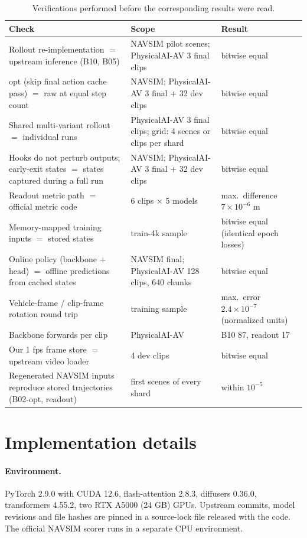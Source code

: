 \documentclass[10pt]{article}
\begin{document}
\begin{table}[H]
\caption{Verifications performed before the corresponding results were read.}
\begin{center}
\small
\begin{tabular}{p{7.5cm}p{3.8cm}p{3cm}}
\toprule
Check & Scope & Result \\
\midrule
Rollout re-implementation $=$ upstream inference (B10, B05) & NAVSIM pilot scenes; PhysicalAI-AV 3 final clips & bitwise equal \\
opt (skip final action cache pass) $=$ raw at equal step count & NAVSIM; PhysicalAI-AV 3 final + 32 dev clips & bitwise equal \\
Shared multi-variant rollout $=$ individual runs & PhysicalAI-AV 3 final clips; grid: 4 scenes or clips per shard & bitwise equal \\
Hooks do not perturb outputs; early-exit states $=$ states captured during a full run & NAVSIM; PhysicalAI-AV 3 final + 32 dev clips & bitwise equal \\
Readout metric path $=$ official metric code & 6 clips $\times$ 5 models & max.\ difference $7 \times 10^{-6}$ m \\
Memory-mapped training inputs $=$ stored states & train-4k sample & bitwise equal (identical epoch losses) \\
Online policy (backbone $+$ head) $=$ offline predictions from cached states & NAVSIM final; PhysicalAI-AV 128 clips, 640 chunks & bitwise equal \\
Vehicle-frame / clip-frame rotation round trip & training sample & max.\ error $2.4 \times 10^{-7}$ (normalized units) \\
Backbone forwards per clip & PhysicalAI-AV & B10 87, readout 17 \\
Our 1 fps frame store $=$ upstream video loader & 4 dev clips & bitwise equal \\
Regenerated NAVSIM inputs reproduce stored trajectories (B02-opt, readout) & first scenes of every shard & within $10^{-5}$ \\
\bottomrule
\end{tabular}
\end{center}
\end{table}

\section{Implementation details}
\label{app:impl}

\paragraph{Environment.} PyTorch 2.9.0 with CUDA 12.6, flash-attention 2.8.3, diffusers 0.36.0, transformers 4.55.2, two RTX A5000 (24 GB) GPUs. Upstream commits, model revisions and file hashes are pinned in a source-lock file released with the code. The official NAVSIM scorer runs in a separate CPU environment.
\end{document}
